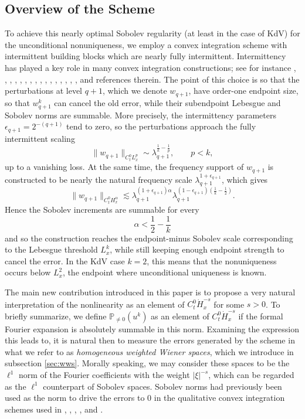 \documentclass[12pt,reqno,letterpaper]{amsart}
\numberwithin{equation}{section}
\newcommand{\1}{{\bf 1}}
\newcommand{\2}{{\bf 2}}
\theoremstyle{remark}
\theoremstyle{remark}
\begin{document}
\subsection{Overview of the Scheme}\label{subsec_scheme}
To achieve this nearly optimal Sobolev regularity (at least in the case of \textsf{KdV}) for the unconditional nonuniqueness, we employ a convex integration scheme with intermittent building blocks which are nearly fully intermittent. Intermittency has played a key role in many convex integration constructions; see for instance  \cite{ABGN}, \cite{BBV}, \cite{BCV}, \cite{BMNV}, \cite{BV19}, \cite{CH}, \cite{CL2}, \cite{CheskidovLuo}, \cite{DS17}, \cite{GKN23}, \cite{Gismondi}, \cite{GR}, \cite{Luo}, \cite{MS}, \cite{NV}, \cite{Pathak}, \cite{Peng} and references therein. The point of this choice is so that the perturbations at level $q+1$, which we denote $w_{q+1}$, have order-one endpoint size, so that $w_{q+1}^k$ can cancel the old error, while their subendpoint Lebesgue and Sobolev norms are summable. More precisely, the intermittency parameters $\epsilon_{q+1}=2^{-(q+1)}$ tend to zero, so the perturbations approach the fully intermittent scaling
\[
\|w_{q+1}\|_{C_t^0L^p_x} \sim \lambda_{q+1}^{\frac1k-\frac1p}, \qquad p<k,
\]
up to a vanishing loss. At the same time, the frequency support of $w_{q+1}$ is constructed to be nearly the natural frequency scale $\lambda_{q+1}^{1+\epsilon_{q+1}}$, which gives
\[
\|w_{q+1}\|_{C_t^0H^\alpha_x} \lesssim \lambda_{q+1}^{(1+\epsilon_{q+1})\alpha}\lambda_{q+1}^{(1-\epsilon_{q+1})(\frac1k-\frac12)}.
\]
Hence the Sobolev increments are summable for every
\[
\alpha <\frac12-\frac1k
\]
and so the construction reaches the endpoint-minus Sobolev scale corresponding to the Lebesgue threshold $L^k_x$, while still keeping enough endpoint strength to cancel the error. In the \textsf{KdV} case $k=2$, this means that the nonuniqueness occurs below $L^2_x$, the endpoint where unconditional uniqueness is known.


The main new contribution introduced in this paper is to propose a very natural interpretation of the nonlinearity as an element of $C_t^0 \dot{H}_x^{-s}$ for some $s > 0$. To briefly summarize, we define $\mathbb{P}_{\not=0}(u^k)$ as an element of $C_t^0 \dot{H}_x^{-s}$ if the formal Fourier expansion is absolutely summable in this norm. Examining the expression this leads to, it is natural then to measure the errors generated by the scheme in what we refer to as \textit{homogeneous weighted Wiener spaces}, which we introduce in subsection \ref{sec:wws}. Morally speaking, we may consider these spaces to be the $\ell^1$ norm of the Fourier coefficients with the weight $|\xi|^{-s}$, which can be regarded as the $\ell^1$ counterpart of Sobolev spaces. Sobolev norms had previously been used as the norm to drive the errors to $0$ in the qualitative convex integration schemes used in \cite{ABGN}, \cite{CH}, \cite{Gismondi}, \cite{GR}, and \cite{Pathak}.
\end{document}
